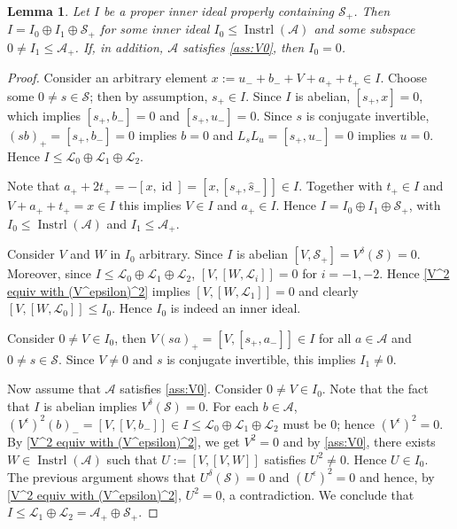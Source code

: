 \documentclass[oneside,a4paper]{amsart} %
\newtheorem{lemma}[theorem]{Lemma}
\theoremstyle{definition}
\DeclareMathOperator{\Inst}{Instrl}
\DeclareMathOperator{\id}{id}
\newcommand{\A}{\mathcal{A}}
\renewcommand{\SS}{\mathcal{S}}
\newcommand{\LL}{\mathcal{L}}
\numberwithin{equation}{section}
\begin{document}
\begin{lemma}
\label{Containing S}
	Let $I$ be a proper inner ideal properly containing $\SS_+$. Then $I = I_0\oplus I_1\oplus \SS_+$ for some inner ideal $I_0\leq \Inst(\A)$ and some subspace $0\neq I_1\leq \A_+$.
	If, in addition, $\A$ satisfies \cref{ass:V0}, then $I_0=0$.
\end{lemma}
\begin{proof}
	Consider an arbitrary element $x := u_- + b_- + V + a_+ + t_+ \in I$.
	Choose some $0 \neq s \in \SS$; then by assumption, $s_+ \in I$.
	Since $I$ is abelian, $[s_+,x] = 0$, which implies $[s_+,b_-] = 0$ and $[s_+,u_-] = 0$.
	Since $s$ is conjugate invertible, $(sb)_+=[s_+,b_-]=0$ implies $b=0$ and
	$L_s L_u = [s_+,u_-] = 0$ implies $u=0$.
	Hence $I \leq \LL_0 \oplus \LL_1 \oplus \LL_2$. 
	
	Note that $a_++2t_+=-[x,\id]=[x,[s_+,\hat s_-]]\in I$.
	Together with $t_+\in I$ and $V+a_++t_+=x\in I$ this implies $V\in I$ and $a_+\in I$.
	Hence $I=I_0\oplus I_1\oplus \SS_+$, with $I_0\leq \Inst(\A)$ and $I_1\leq \A_+$.
	
	Consider $V$ and $W$ in $I_0$ arbitrary. 
	Since $I$ is abelian $[V,\SS_+]=V^\delta(\SS)=0$.
	Moreover, since $I \leq \LL_0 \oplus \LL_1 \oplus \LL_2$, $[V,[W,\LL_i]]=0$ for $i=-1,-2$.
	Hence \cref{V^2 equiv with (V^epsilon)^2} implies $[V,[W,\LL_1]]=0$ and clearly $[V,[W,\LL_0]]\leq I_0$.
	Hence $I_0$ is indeed an inner ideal.
	
	Consider $0\neq V\in I_0$, then $V(sa)_+=[V,[s_+,a_-]]\in I$ for all $a\in \A$ and $0\neq s \in\SS$.
	Since $V\neq 0$ and $s$ is conjugate invertible, this implies $I_1\neq 0$.
	
	Now assume that $\A$ satisfies \cref{ass:V0}.
	Consider $0\neq V\in I_0$.
	Note that the fact that $I$ is abelian implies $V^\delta(\SS)=0$.
	For each $b \in \A$, $(V^\epsilon)^2(b)_-=[V,[V,b_-]]\in I \leq \LL_0 \oplus \LL_1 \oplus \LL_2$ must be $0$; hence $(V^\epsilon)^2=0$.
	By \cref{V^2 equiv with (V^epsilon)^2}, we get $V^2=0$ and by \cref{ass:V0}, there exists $W\in\Inst(\A)$ such that $U:=[V,[V,W]]$ satisfies $U^2\neq 0$. 
	Hence $U\in I_0$.
	The previous argument shows that $U^\delta(\SS) = 0$ and $(U^{\epsilon})^2=0$ and hence, by \cref{V^2 equiv with (V^epsilon)^2}, $U^2=0$, a contradiction. 
	We conclude that $I \leq \LL_1 \oplus \LL_2 = \A_+ \oplus \SS_+$.
\end{proof}
\end{document}

